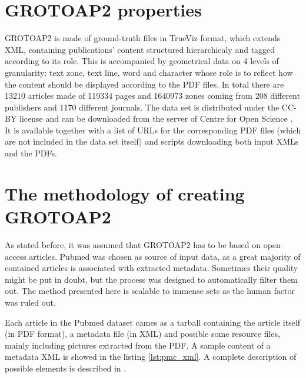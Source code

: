 \section{GROTOAP2 properties}
GROTOAP2 is made of ground-truth files in TrueViz format, which extends XML, containing publications' content structured hierarchicaly and tagged according to its role. This is accompanied by geometrical data on 4 levels of granularity: text zone, text line, word and character whose role is to reflect how the content should be displayed according to the PDF files. In total there are 13210 articles made of 119334 pages and 1640973 zones coming from 208 different publishers and 1170 different journals. The data set is distributed under the CC-BY license and can be downloaded from the server of Centre for Open Science \cite{CeON}. It is available together with a list of URLs for the corresponding PDF files (which are not included in the data set itself) and scripts downloading both input XMLs and the PDFs.


\qquad
\section{The methodology of creating GROTOAP2}
As stated before, it was assumed that GROTOAP2 has to be based on open access articles. Pubmed was chosen as source of input data, as a great majority of contained articles is associated with extracted metadata. Sometimes their quality might be put in doubt, but the process was designed to automatically filter them out. The method presented here is scalable to immense sets as the human factor was ruled out.

Each article in the Pubmed dataset cames as a tarball containing the article itself (in PDF format), a metadata file (in XML) and possible some resource files, mainly including pictures extracted from the PDF. A sample content of a metadata XML is showed in the listing \ref{lst:pmc_xml}. A complete description of possible elements is described in \cite{PubmedXML}.


